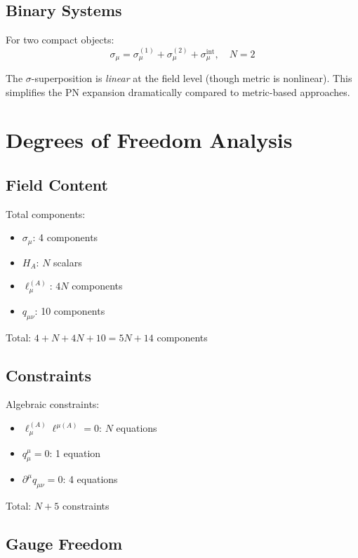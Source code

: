 \documentclass[11pt,a4paper]{article}
\theoremstyle{definition}
\theoremstyle{remark}
\begin{document}
		\subsection{Binary Systems}
		
		For two compact objects:
		\begin{equation}
			\sigma_\mu = \sigma_\mu^{(1)} + \sigma_\mu^{(2)} + \sigma_\mu^{\text{int}}, \quad N = 2
		\end{equation}
		
		The $\sigma$-superposition is \emph{linear} at the field level (though metric is nonlinear). This simplifies the PN expansion dramatically compared to metric-based approaches.
		
		\section{Degrees of Freedom Analysis}
		
		\subsection{Field Content}
		
		Total components:
		\begin{itemize}
			\item $\sigma_\mu$: 4 components
			\item $H_A$: $N$ scalars
			\item $\ell_\mu^{(A)}$: $4N$ components
			\item $q_{\mu\nu}$: 10 components
		\end{itemize}
		Total: $4 + N + 4N + 10 = 5N + 14$ components
		
		\subsection{Constraints}
		
		Algebraic constraints:
		\begin{itemize}
			\item $\ell_\mu^{(A)}\ell^{\mu(A)} = 0$: $N$ equations
			\item $q^\mu_\mu = 0$: 1 equation
			\item $\partial^\mu q_{\mu\nu} = 0$: 4 equations
		\end{itemize}
		Total: $N + 5$ constraints
		
		\subsection{Gauge Freedom}
		
\end{document}
